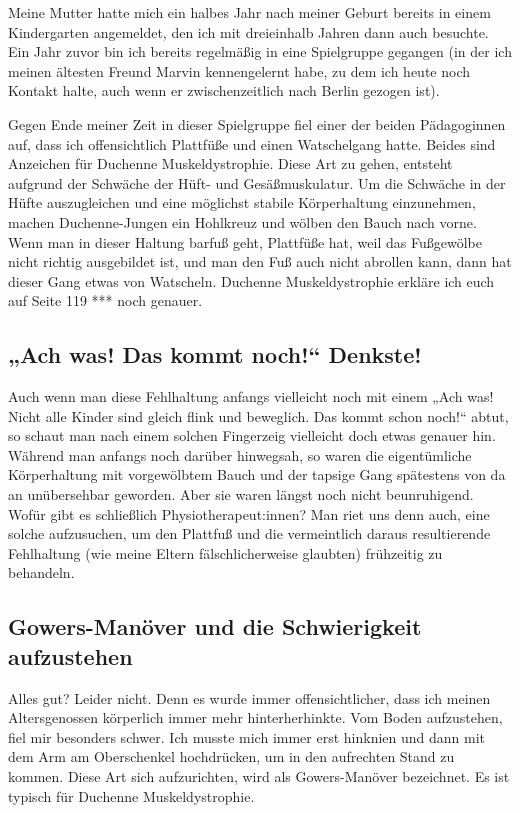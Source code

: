 \documentclass[fontsize=14pt,a4paper,headinclude,DIV=calc,automark]{scrbook}
\begin{document}
Meine Mutter hatte mich ein halbes Jahr nach meiner Geburt bereits in einem Kindergarten angemeldet, den ich mit dreieinhalb Jahren dann auch besuchte. Ein Jahr zuvor bin ich bereits regelmäßig in eine Spielgruppe gegangen (in der ich meinen ältesten Freund Marvin kennengelernt habe, zu dem ich heute noch Kontakt halte, auch wenn er zwischenzeitlich nach Berlin gezogen ist).

Gegen Ende meiner Zeit in dieser Spielgruppe fiel einer der beiden Pädagoginnen auf, dass ich offensichtlich Plattfüße und einen Watschelgang hatte. Beides sind Anzeichen für Duchenne Muskeldystrophie. Diese Art zu gehen, entsteht aufgrund der Schwäche der Hüft- und Gesäßmuskulatur. Um die Schwäche in der Hüfte auszugleichen und eine möglichst stabile Körperhaltung einzunehmen, machen Duchenne-Jungen ein Hohlkreuz und wölben den Bauch nach vorne. Wenn man in dieser Haltung barfuß geht, Plattfüße hat, weil das Fußgewölbe nicht richtig ausgebildet ist, und man den Fuß auch nicht abrollen kann, dann hat dieser Gang etwas von Watscheln. Duchenne Muskeldystrophie erkläre ich euch auf Seite 119 *** noch genauer.

\subsection{„Ach was! Das kommt noch!“ Denkste!}

Auch wenn man diese Fehlhaltung anfangs vielleicht noch mit einem „Ach was! Nicht alle Kinder sind gleich flink und beweglich. Das kommt schon noch!“ abtut, so schaut man nach einem solchen Fingerzeig vielleicht doch etwas genauer hin. Während man anfangs noch darüber hinwegsah, so waren die eigentümliche Körperhaltung mit vorgewölbtem Bauch und der tapsige Gang spätestens von da an unübersehbar geworden. Aber sie waren längst noch nicht beunruhigend. Wofür gibt es schließlich Physiotherapeut:innen? Man riet uns denn auch, eine solche aufzusuchen, um den Plattfuß und die vermeintlich daraus resultierende Fehlhaltung (wie meine Eltern fälschlicherweise glaubten) frühzeitig zu behandeln.
              
\subsection{Gowers-Manöver und die Schwierigkeit aufzustehen}

Alles gut? Leider nicht. Denn es wurde immer offensichtlicher, dass ich meinen Altersgenossen körperlich immer mehr hinterherhinkte. Vom Boden aufzustehen, fiel mir besonders schwer. Ich musste mich immer erst hinknien und dann mit dem Arm am Oberschenkel hochdrücken, um in den aufrechten Stand zu kommen. Diese Art sich aufzurichten, wird als Gowers-Manöver bezeichnet. Es ist typisch für Duchenne Muskeldystrophie.
\end{document}
